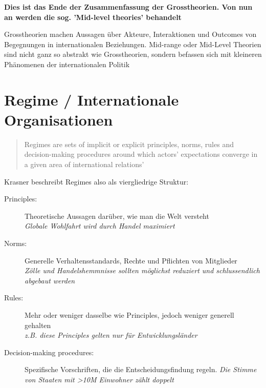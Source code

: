 \documentclass[a4paper, 11pt]{article}
\begin{document}
\hrulefill

\vspace{10px}

\noindent \textbf{Dies ist das Ende der Zusammenfassung der Grosstheorien. Von nun an werden die sog. 'Mid-level theories' behandelt}

\vspace{10px}

\hrulefill

\vspace{30px}

\noindent Grosstheorien machen Aussagen über Akteure, Interaktionen und Outcomes von Begegnungen in internationalen Beziehungen. Mid-range oder Mid-Level Theorien sind nicht ganz so abstrakt wie Grosstheorien, sondern befassen sich mit kleineren Phänomenen der internationalen Politik

\newpage

\section{Regime / Internationale Organisationen} \label{sec:Regime}
\begin{quote}
	\begin{blockquote}[Krasner 1983]{Regimes are sets of implicit or explicit principles, norms, rules and decision-making procedures around which actors' expectations converge in a given area of international relations'}
	\end{blockquote}
\end{quote}

\noindent Krasner beschreibt Regimes also als viergliedrige Struktur:

\begin{description}
	\item[Principles: ] Theoretische Aussagen darüber, wie man die Welt versteht \\
	\textit{Globale Wohlfahrt wird durch Handel maximiert}
	\item[Norms: ] Generelle Verhaltensstandards, Rechte und Pflichten von Mitglieder \\
	\textit{Zölle und Handelshemmnisse sollten möglichst reduziert und schlussendlich abgebaut werden}
	\item[Rules:] Mehr oder weniger dasselbe wie Principles, jedoch weniger generell gehalten \\
	\textit{z.B. diese Principles gelten nur für Entwicklungsländer}
	\item[Decision-making procedures: ] Spezifische Vorschriften, die die Entscheidungsfindung regeln. 
	\textit{Die Stimme von Staaten mit >10M Einwohner zählt doppelt}
\end{description}
\end{document}
